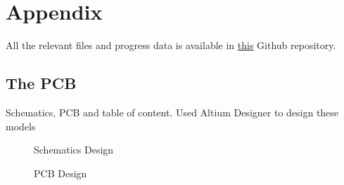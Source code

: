 

\chapter{Appendix}
All the relevant files and progress data is available in \href{https://github.com/dakshinatharindu/Digital-Alarm-Clock}{this} Github repository.
\section{The PCB}
Schematics, PCB and table of content.
Used Altium Designer to design these models
  \begin{figure}
  \noindent{}
  \caption{Schematics Design}
\end{figure}


\newpage

  \begin{figure}
  \noindent{}
  \caption{PCB Design}
\end{figure}

